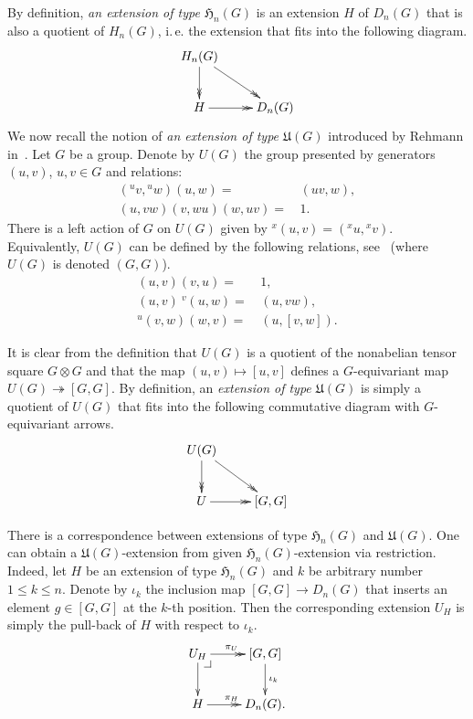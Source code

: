 \documentclass[oneside, 12pt]{amsart}
\makeatletter
\theoremstyle{plain}
\numberwithin{equation}{section}
\numberwithin{lemma}{section}
\theoremstyle{remark}
\theoremstyle{definition}
\newcommand{\pullbackcorner}[1][dr]{\save*!/#1-1.2pc/#1:(-1,1)@^{|-}\restore}
\makeatother
\begin{document}
By definition, {\it an extension of type $\mathfrak{H}_n(G)$} is an extension $H$ of $D_n(G)$ that is also a quotient of $H_n(G)$, i.\,e. 
 the extension that fits into the following diagram.
\[ \xymatrix{ H_n(G) \ar@{->>}[rd] \ar@{->>}[d] & \\ H \ar@{->>}[r] & D_n(G)} \]
We now recall the notion of \emph{an extension of type $\mathfrak{U}(G)$} introduced by Rehmann in~\cite[\S~1]{Reh78}.
Let $G$ be a group. Denote by $U(G)$ the group presented by generators $(u, v)$, $u,v\in G$ and relations:
\begin{align}
 ({}^{u} v, {}^{u}w) (u,  w) = &\, (uv, w), \tag{U1} \label{U1} \\
 (u,  vw) (v,  wu) (w,  uv)  = &\, 1.       \tag{U2} \label{U2}
\end{align}
There is a left action of $G$ on $U(G)$ given by ${}^x (u, v) = ({}^{x}u, {}^{x}v).$
Equivalently, $U(G)$ can be defined by the following relations, see~\cite[p.~8]{De76} (where $U(G)$ is denoted $(G, G)$).
\begin{align} 
 (u, v) (v, u)     = &\, 1,          \label{U4} \\
 (u, v) \ {}^v(u, w) = &\, (u, vw),  \label{U6} \\
 {}^u(v, w)(w, v)  = &\, (u, [v, w]).\label{U9} \end{align}
 
It is clear from the definition that $U(G)$ is a quotient of the nonabelian tensor square $G\otimes G$ and that
the map $(u, v) \mapsto [u, v]$ defines a $G$-equivariant map $U(G) \twoheadrightarrow [G, G]$.
By definition, an {\it extension of type $\mathfrak{U}(G)$} is simply a quotient of $U(G)$
 that fits into the following commutative diagram with $G$-equivariant arrows.
\[ \xymatrix{ U(G) \ar@{->>}[rd] \ar@{->>}[d] & \\ U \ar@{->>}[r] & [G, G]} \]

There is a correspondence between extensions of type $\mathfrak{H}_n(G)$ and $\mathfrak{U}(G)$.
One can obtain a $\mathfrak{U}(G)$-extension from given $\mathfrak{H}_n(G)$-extension via restriction.
Indeed, let $H$ be an extension of type $\mathfrak{H}_n(G)$ and $k$ be arbitrary number $1\leq k\leq n$.
Denote by $\iota_k$ the inclusion map $[G, G] \to D_n(G)$ that inserts an element $g \in [G, G]$ at the $k$-th position.
Then the corresponding extension $U_H$ is simply the pull-back of $H$ with respect to $\iota_k$.
\[ \xymatrix{ U_H \pullbackcorner \ar[d] \ar@{->>}[r]^{\pi_U} & [G, G] \ar[d]^{\iota_k} \\ H \ar@{->>}[r]^{\pi_H} & D_n(G).} \]
\end{document}

